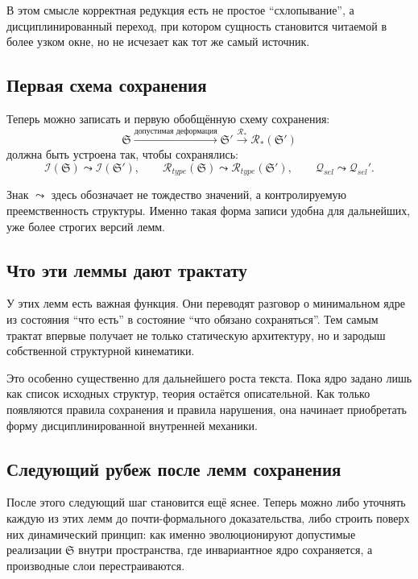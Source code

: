 \documentclass[12pt,a4paper]{article}
\begin{document}
В этом смысле корректная редукция есть не простое ``схлопывание'', а дисциплинированный переход, при котором сущность становится читаемой в более узком окне, но не исчезает как тот же самый источник.

\subsection{Первая схема сохранения}

Теперь можно записать и первую обобщённую схему сохранения:
\begin{equation}
\mathfrak{S}
\xrightarrow{\text{допустимая деформация}}
\mathfrak{S}'
\xrightarrow{\mathcal{R}_*}
\mathcal{R}_*(\mathfrak{S}')
\end{equation}
должна быть устроена так, чтобы сохранялись:
\begin{equation}
\mathcal{I}(\mathfrak{S}) \leadsto \mathcal{I}(\mathfrak{S}'),
\qquad
\mathcal{R}_{type}(\mathfrak{S}) \leadsto \mathcal{R}_{type}(\mathfrak{S}'),
\qquad
\mathcal{Q}_{sel} \leadsto \mathcal{Q}_{sel}'.
\end{equation}

Знак \(\leadsto\) здесь обозначает не тождество значений, а контролируемую преемственность структуры. Именно такая форма записи удобна для дальнейших, уже более строгих версий лемм.

\subsection{Что эти леммы дают трактату}

У этих лемм есть важная функция. Они переводят разговор о минимальном ядре из состояния ``что есть'' в состояние ``что обязано сохраняться''. Тем самым трактат впервые получает не только статическую архитектуру, но и зародыш собственной структурной кинематики.

Это особенно существенно для дальнейшего роста текста. Пока ядро задано лишь как список исходных структур, теория остаётся описательной. Как только появляются правила сохранения и правила нарушения, она начинает приобретать форму дисциплинированной внутренней механики.

\subsection{Следующий рубеж после лемм сохранения}

После этого следующий шаг становится ещё яснее. Теперь можно либо уточнять каждую из этих лемм до почти-формального доказательства, либо строить поверх них динамический принцип: как именно эволюционируют допустимые реализации \(\mathfrak{S}\) внутри пространства, где инвариантное ядро сохраняется, а производные слои перестраиваются.
\end{document}
